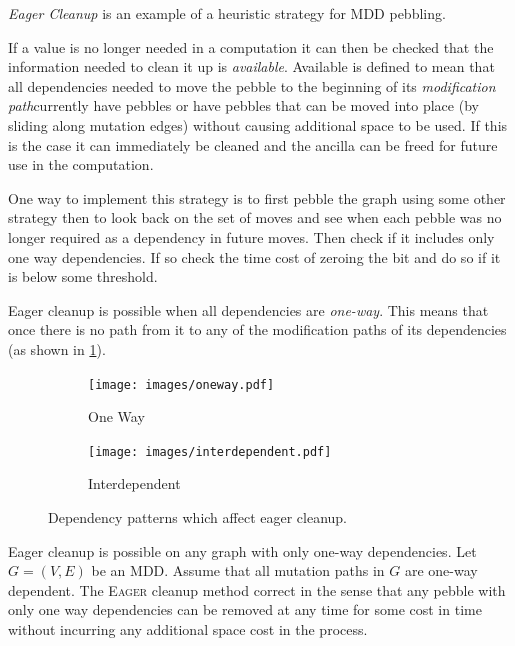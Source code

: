 \emph{Eager Cleanup} is an example of a heuristic strategy for MDD pebbling.

If a value is no longer needed in a computation it can then be checked that the
information needed to clean it up is \emph{available}. Available is defined to
mean that all dependencies needed to move the pebble to the beginning of its
\emph{modification path}\footnotemark currently have pebbles or have pebbles that can be moved into
place (by sliding along mutation edges) without causing additional space to be
used. If this is the case it can immediately be cleaned and the ancilla can be
freed for future use in the computation. 


One way to implement this strategy is to first pebble the graph using some
other strategy then to look back on the set of moves and see when each pebble
was no longer required as a dependency in future moves. Then check if it
includes only one way dependencies. If so check the time cost of zeroing the
bit and do so if it is below some threshold. 

Eager cleanup is possible when all dependencies are \emph{one-way}.
This means that once there is no path from it to any of the modification paths
of its dependencies (as shown in \cref{fig:one-way}).

\begin{figure}
  \centering
  \begin{subfigure}[b]{0.3\textwidth}
    \texttt{[image: images/oneway.pdf]}
    \caption{One Way}
    \label{fig:one-way}
  \end{subfigure}
  \qquad \qquad \qquad
  \begin{subfigure}[b]{0.3\textwidth}
    \texttt{[image: images/interdependent.pdf]}
    \caption{Interdependent}
    \label{fig:interdep}
  \end{subfigure}
  \caption{Dependency patterns which affect eager cleanup.}
\end{figure}


\begin{theorem} Eager cleanup is possible on any graph with only one-way
dependencies.  Let $G=(V,E)$ be an MDD.  Assume that all mutation paths in $G$
are one-way dependent. The \textsc{Eager} cleanup method correct in the sense
that any pebble with only one way dependencies can be removed at any time for
some cost in time without incurring any additional space cost in the process.\end{theorem}

